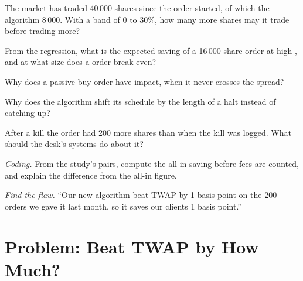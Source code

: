 \begin{exercise}[$\star$]\label{exo:mx:build-an-execution-algorithm:2}
The market has traded 40\,000 shares since the order started, of which the algorithm 8\,000. With a band of 0 to 30\%, how many more shares may it
trade before trading more?
\end{exercise}

\begin{exercise}[$\star$]\label{exo:mx:build-an-execution-algorithm:3}
From the regression, what is the expected saving of a 16\,000-share order at high , and at what size does a  order break even?
\end{exercise}

\begin{exercise}[$\star\star$]\label{exo:mx:build-an-execution-algorithm:4}
Why does a passive buy order have impact, when it never crosses the spread?
\end{exercise}

\begin{exercise}[$\star\star$]\label{exo:mx:build-an-execution-algorithm:5}
Why does the algorithm shift its schedule by the length of a halt instead of catching up?
\end{exercise}

\begin{exercise}[$\star\star$]\label{exo:mx:build-an-execution-algorithm:6}
After a kill the order had 200 more shares than when the kill was logged. What should the desk's systems do about it?
\end{exercise}

\begin{exercise}[$\star\star\star$]\label{exo:mx:build-an-execution-algorithm:7}
\emph{Coding.} From the study's pairs, compute the all-in saving before fees are counted, and explain the difference from the all-in figure.
\end{exercise}

\begin{exercise}[$\star\star\star$]\label{exo:mx:build-an-execution-algorithm:8}
\emph{Find the flaw.} ``Our new algorithm beat TWAP by 1 basis point on the 200 orders we gave it last month, so it saves our clients 1 basis point.''
\end{exercise}

\section{Problem: Beat TWAP by How Much?}

